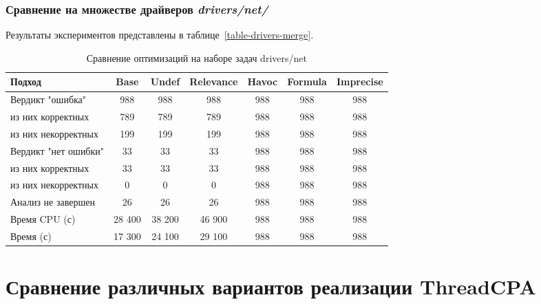 \subsubsection{Сравнение на множестве драйверов \textit{drivers/net/} }

Результаты экспериментов представлены в таблице~\ref{table-drivers-merge}.

\begin{center}
  \begin{table}[h]\footnotesize
  	\label{table-drivers-opt}
    \caption{Сравнение оптимизаций на наборе задач drivers/net}
    \begin{tabular}{ | l | c | c | c | c | c | c |}
      \hline
      Подход         				& Base 	& Undef	& Relevance & Havoc & Formula 	& Imprecise   \\ \hline
      Вердикт "ошибка" 				& 988  	& 988   & 988       & 988   & 988     	& 988      	\\ 
  \hspace{0.5cm} из них корректных 	& 789 	& 789 	& 789     	& 988   & 988    	& 988     	\\ 
  \hspace{0.5cm} из них некорректных & 199 	& 199 	& 199     	& 988  	& 988       & 988       \\ \hline
      Вердикт "нет ошибки"  		& 33    & 33    & 33     	& 988   & 988      	& 988      	\\ 
  \hspace{0.5cm} из них корректных 	& 33 	& 33    & 33       	& 988   & 988      	& 988     	\\
  \hspace{0.5cm} из них некорректных & 0 	& 0    	& 0      	& 988   & 988     	& 988       \\ \hline
      Анализ не завершен       		& 26    & 26    & 26     	& 988   & 988    	& 988      	\\ \hline
      Время CPU (с)   				& 28 400 & 38 200 & 46 900  & 988   & 988    	& 988     	\\ 
      Время (с)  					& 17 300 & 24 100 & 29 100  & 988   & 988    	& 988    	\\
      \hline
    \end{tabular}
  \end{table}
\end{center}


\section{Сравнение различных вариантов реализации ThreadCPA}

